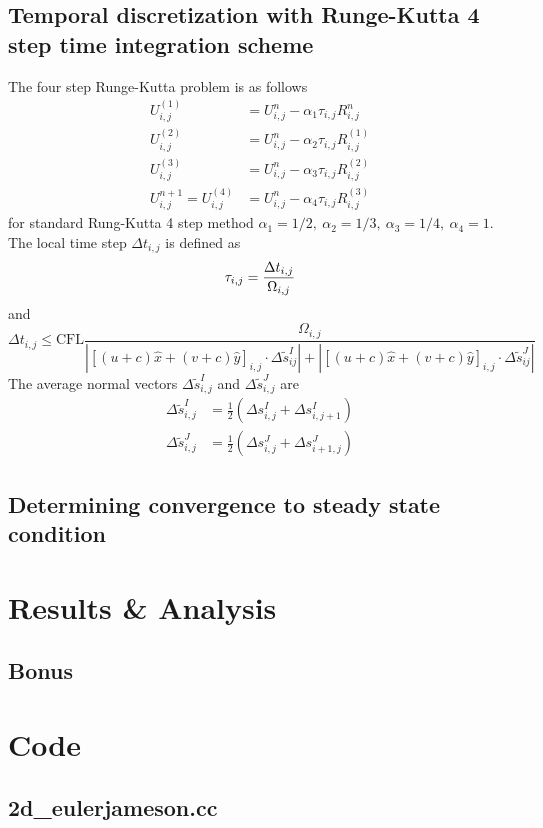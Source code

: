 \documentclass[11pt]{article}
\begin{document}
	\subsection{Temporal discretization with Runge-Kutta 4 step time integration scheme}
	The four step Runge-Kutta problem is as follows
		\begin{align}
		U_{i,j}^{(1)} &= U_{i,j}^n - \alpha_1 \tau_{i,j} R_{i,j}^n \\
		U_{i,j}^{(2)} &= U_{i,j}^n - \alpha_2 \tau_{i,j} R_{i,j}^{(1)} \\
		U_{i,j}^{(3)} &= U_{i,j}^n - \alpha_3 \tau_{i,j} R_{i,j}^{(2)} \\
		U_{i,j}^{n+1} = U_{i,j}^{(4)} &= U_{i,j}^n - \alpha_4 \tau_{i,j} R_{i,j}^{(3)} 
		\end{align}
	for standard Rung-Kutta 4 step method $\alpha_1 = 1/2,~\alpha_2 = 1/3,~\alpha_3 = 1/4,~\alpha_4 = 1$.  The local time step $\Delta t_{i,j}$ is defined as
		\begin{equation}
		\tau_{i,j} = \frac{\Delta t_{i,j}}{\Omega_{i,j}} \\
		\end{equation}
	and
		\begin{equation}
		\Delta t_{i,j} \leq \text{CFL} \frac{\Omega_{i,j}}{\left| \left[(u + c)\hat{x} + (v+c)\hat{y}\right]_{i,j}\cdot \Delta \tilde{s}_{ij}^I\right| + \left|  \left[(u + c)\hat{x} + (v+c)\hat{y}\right]_{i,j} \cdot \Delta \tilde{s}_{ij}^J\right|}
		\end{equation}
	The average normal vectors $\Delta\tilde{s}_{i,j}^I$ and $\Delta\tilde{s}_{i,j}^J$ are
		\begin{align}
		\Delta\tilde{s}_{i,j}^I & = \frac{1}{2} \left( \Delta s_{i,j}^I + \Delta s_{i,j+1}^I\right) \\
		\Delta\tilde{s}_{i,j}^J & = \frac{1}{2} \left( \Delta s_{i,j}^J + \Delta s_{i+1,j}^J\right) 
		\end{align}
		
	
	\subsection{Determining convergence to steady state condition}

\section{Results \& Analysis}	
		
	
\subsection{Bonus}

	
	

\pagebreak
\appendix
\section{Code}
	\subsection{2d\_euler\-jameson.cc}
%		
		
	
\end{document}
